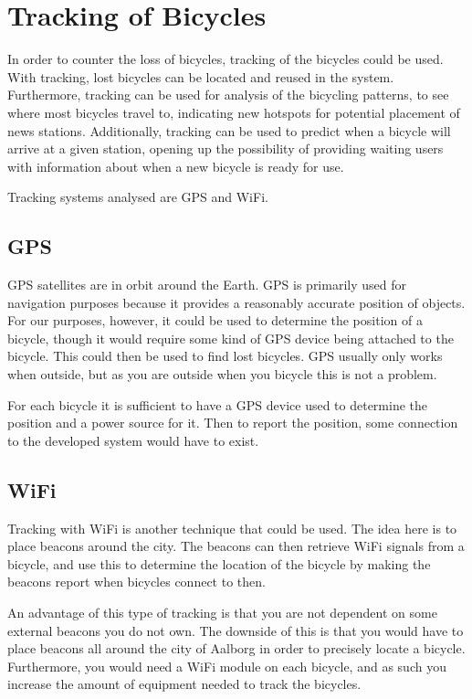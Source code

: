 \section{Tracking of Bicycles}
In order to counter the loss of bicycles, tracking of the bicycles could be used.
With tracking, lost bicycles can be located and reused in the system.
Furthermore, tracking can be used for analysis of the bicycling patterns, to see where most bicycles travel to, indicating new hotspots for potential placement of news stations.
Additionally, tracking can be used to predict when a bicycle will arrive at a given station, opening up the possibility of providing waiting users with information about when a new bicycle is ready for use.

Tracking systems analysed are GPS and WiFi.

\subsection{GPS}
GPS satellites are in orbit around the Earth.
GPS is primarily used for navigation purposes because it provides a reasonably accurate position of objects.
For our purposes, however, it could be used to determine the position of a bicycle, though it would require some kind of GPS device being attached to the bicycle.
This could then be used to find lost bicycles.
GPS usually only works when outside, but as you are outside when you bicycle this is not a problem\citep{misc:howgpsworks}.

For each bicycle it is sufficient to have a GPS device used to determine the position and a power source for it.
Then to report the position, some connection to the developed system would have to exist.

\subsection{WiFi}
Tracking with WiFi is another technique that could be used.
The idea here is to place beacons around the city.
The beacons can then retrieve WiFi signals from a bicycle, and use this to determine the location of the bicycle by making the beacons report when bicycles connect to then.

An advantage of this type of tracking is that you are not dependent on some external beacons you do not own.
The downside of this is that you would have to place beacons all around the city of Aalborg in order to precisely locate a bicycle.
Furthermore, you would need a WiFi module on each bicycle, and as such you increase the amount of equipment needed to track the bicycles.

